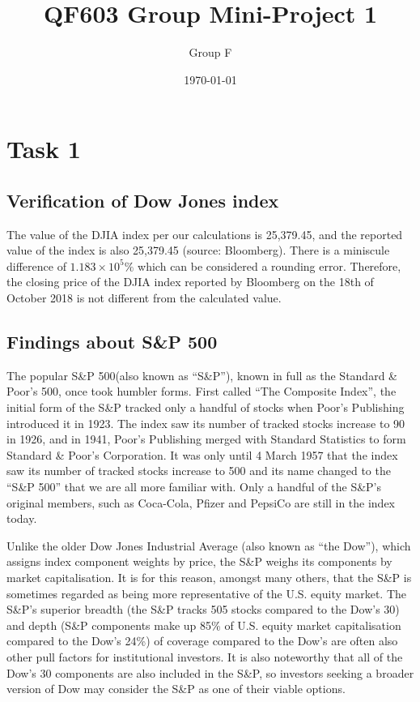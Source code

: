 \documentclass[a4paper]{article}
\title{QF603 Group Mini-Project 1}
\author{Group F}
\date{\today}
\begin{document}
\maketitle


\vspace{10mm}
\section{Task 1}
\label{sec:introduction}

\subsection{Verification of Dow Jones index}
The value of the DJIA index per our calculations is 25,379.45, and the reported value of the index is also 25,379.45 (source: Bloomberg). There is a miniscule difference of $1.183\times10^5\%$ which can be considered a rounding error. Therefore, the closing price of the DJIA index reported by Bloomberg on the 18th of October 2018 is not different from the calculated value.


\subsection{Findings about S\&P 500}
The popular S\&P 500(also known as “S\&P”), known in full as the Standard \& Poor’s 500, once took humbler forms. First called “The Composite Index”, the initial form of the S\&P tracked only a handful of stocks when Poor’s Publishing introduced it in 1923. The index saw its number of tracked stocks increase to 90 in 1926, and in 1941, Poor’s Publishing merged with Standard Statistics to form Standard \& Poor’s Corporation. It was only until 4 March 1957 that the index saw its number of tracked stocks increase to 500 and its name changed to the “S\&P 500” that we are all more familiar with. Only a handful of the S\&P’s original members, such as Coca-Cola, Pfizer and PepsiCo are still in the index today.

Unlike the older Dow Jones Industrial Average (also known as “the Dow”), which assigns index component weights by price, the S\&P weighs its components by market capitalisation. It is for this reason, amongst many others, that the S\&P is sometimes regarded as being more representative of the U.S. equity market. The S\&P’s superior breadth (the S\&P tracks 505 stocks compared to the Dow’s 30) and depth (S\&P components make up 85\% of U.S. equity market capitalisation compared to the Dow’s 24\%) of coverage compared to the Dow’s are often also other pull factors for institutional investors. It is also noteworthy that all of the Dow’s 30 components are also included in the S\&P, so investors seeking a broader version of Dow may consider the S\&P as one of their viable options.
\end{document}
